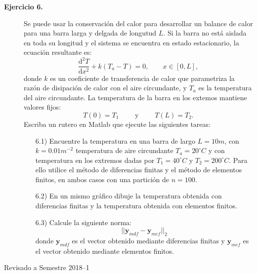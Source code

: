 \documentclass[letterpaper,11pt]{article}
\newcommand{\matlab}{{\sc Matlab} }
\begin{document}
\begin{description}
\item[\textbf{Ejercicio 6.}] Se puede usar la conservaci\'on del calor para desarrollar un balance de calor para una barra larga y delgada de longutud $L$. Si la barra no est\'a aislada en toda su longitud y el sistema se encuentra en estado estacionario, la ecuaci\'on resultante es:
$$
\dfrac{\mathrm{d}^2T}{\mathrm{d}x^2}+k(T_a-T)=0,\qquad x\in [0,L],
$$
donde $k$ es un coeficiente de transferencia de calor que parametriza la raz\'on de disipaci\'on de calor con el aire circundante, y $T_a$ es la temperatura del aire circundante. La temperatura de la barra en los extemos mantiene valores fijos:
$$
T(0)=T_1 \qquad \text{ y } \qquad T(L)=T_2.
$$
Escriba un rutero en \matlab{} que ejecute las siguientes tareas:
\begin{itemize}
\item[6.1)] Encuentre la temperatura en una barra de largo $L=10m$, con $k=0.01m^{-2}$ temperatura de aire circundante $T_a=20^\circ C$ y con temperatura en los extremos dadas por $T_1=40^\circ C$ y $T_2=200^\circ C$. Para ello utilice el m\'etodo de diferencias finitas y el m\'etodo de elementos finitos, en ambos casos con una partici\'on de $n=100$.
\item[6.2)] En un mismo gr\'afico dibuje la temperatura obtenida con diferencias finitas y la temperatura obtenida con elementos finitos.
\item[6.3)] Calcule la siguiente norma:
$$
||\boldsymbol{y}_{mdf}-\boldsymbol{y}_{mef}||_2
$$
donde $\boldsymbol{y}_{mdf}$ es el vector obtenido mediante diferencias finitas y $\boldsymbol{y}_{mef}$ es el vector obtenido mediante elementos finitos.
\end{itemize}

\end{description}


\vfill
\hfill Revisado a Semestre 2018--1
\end{document}
